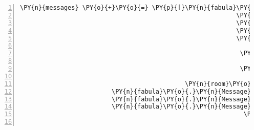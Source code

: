 \begin{Verbatim}[commandchars=\\\{\},numbers=left,firstnumber=1,stepnumber=1]
            \PY{n}{messages} \PY{o}{+}\PY{o}{=} \PY{p}{[}\PY{n}{fabula}\PY{o}{.}\PY{n}{Message}\PY{p}{(}\PY{p}{[}\PY{n}{fabula}\PY{o}{.}\PY{n}{SpawnEvent}\PY{p}{(}\PY{n}{fabula}\PY{o}{.}\PY{n}{Entity}\PY{p}{(}\PY{l+s}{\PYZsq{}}\PY{l+s}{goblet\PYZus{}filled}\PY{l+s}{\PYZsq{}}\PY{p}{,}
                                                           \PY{n}{fabula}\PY{o}{.}\PY{n}{ITEM}\PY{p}{,}
                                                           \PY{n+nb+bp}{True}\PY{p}{,}
                                                           \PY{n+nb+bp}{True}\PY{p}{,}
                                                           \PY{p}{\PYZob{}}\PY{l+s}{\PYZsq{}}\PY{l+s}{image/png}\PY{l+s}{\PYZsq{}}\PY{p}{:} \PY{n}{fabula}\PY{o}{.}\PY{n}{Asset}\PY{p}{(}\PY{n}{uri}\PY{o}{=}\PY{l+s}{\PYZsq{}}\PY{l+s}{goblet\PYZus{}filled.png}\PY{l+s}{\PYZsq{}}\PY{p}{,}
                                                                                      \PY{n}{data}\PY{o}{=}\PY{n+nb+bp}{None}\PY{p}{)}\PY{p}{,}
                                                            \PY{l+s}{\PYZsq{}}\PY{l+s}{audio/ogg}\PY{l+s}{\PYZsq{}}\PY{p}{:} \PY{n}{fabula}\PY{o}{.}\PY{n}{Asset}\PY{p}{(}\PY{n}{uri}\PY{o}{=}\PY{l+s}{\PYZsq{}}\PY{l+s}{goblet\PYZus{}filled.ogg}\PY{l+s}{\PYZsq{}}\PY{p}{,}
                                                                                      \PY{n}{data}\PY{o}{=}\PY{n+nb+bp}{None}\PY{p}{)}\PY{p}{,}
                                                            \PY{l+s}{\PYZsq{}}\PY{l+s}{text/plain}\PY{l+s}{\PYZsq{}}\PY{p}{:} \PY{n}{fabula}\PY{o}{.}\PY{n}{Asset}\PY{p}{(}\PY{n}{uri}\PY{o}{=}\PY{l+s}{\PYZsq{}}\PY{l+s}{goblet\PYZus{}filled.txt}\PY{l+s}{\PYZsq{}}\PY{p}{,}
                                                                                       \PY{n}{data}\PY{o}{=}\PY{n+nb+bp}{None}\PY{p}{)}\PY{p}{\PYZcb{}}\PY{p}{)}\PY{p}{,}
                                             \PY{n}{room}\PY{o}{.}\PY{n}{entity\PYZus{}locations}\PY{p}{[}\PY{n}{ID\PYZus{}KUNI}\PY{p}{]} \PY{o}{+} \PY{p}{(}\PY{n}{room}\PY{o}{.}\PY{n}{identifier}\PY{p}{,}\PY{p}{)}\PY{p}{)}\PY{p}{]}\PY{p}{)}\PY{p}{,}
                         \PY{n}{fabula}\PY{o}{.}\PY{n}{Message}\PY{p}{(}\PY{p}{[}\PY{n}{fabula}\PY{o}{.}\PY{n}{DeleteEvent}\PY{p}{(}\PY{n}{identifier}\PY{o}{=}\PY{l+s}{\PYZsq{}}\PY{l+s}{goblet}\PY{l+s}{\PYZsq{}}\PY{p}{)}\PY{p}{]}\PY{p}{)}\PY{p}{,}
                         \PY{n}{fabula}\PY{o}{.}\PY{n}{Message}\PY{p}{(}\PY{p}{[}\PY{n}{fabula}\PY{o}{.}\PY{n}{DeleteEvent}\PY{p}{(}\PY{n}{identifier}\PY{o}{=}\PY{l+s}{\PYZsq{}}\PY{l+s}{dew}\PY{l+s}{\PYZsq{}}\PY{p}{)}\PY{p}{]}\PY{p}{)}\PY{p}{,}
                         \PY{n}{fabula}\PY{o}{.}\PY{n}{Message}\PY{p}{(}\PY{p}{[}\PY{n}{fabula}\PY{o}{.}\PY{n}{PicksUpEvent}\PY{p}{(}\PY{n}{identifier}\PY{o}{=}\PY{n}{ID\PYZus{}KUNI}\PY{p}{,}
                                                             \PY{n}{item\PYZus{}identifier}\PY{o}{=}\PY{l+s}{\PYZsq{}}\PY{l+s}{goblet\PYZus{}filled}\PY{l+s}{\PYZsq{}}\PY{p}{)}\PY{p}{]}\PY{p}{)}\PY{p}{]}


\end{Verbatim}
